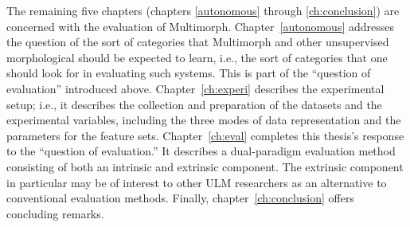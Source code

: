 The remaining five chapters (chapters \ref{autonomous} through \ref{ch:conclusion}) are concerned with the evaluation of Multimorph. Chapter~\ref{autonomous} addresses the question of the sort of categories that Multimorph and other unsupervised morphological should be expected to learn, i.e., the sort of categories that one should look for in evaluating such systems. This is part of the ``question of evaluation'' introduced above. Chapter~\ref{ch:experi} describes the experimental setup; i.e., it describes the collection and preparation of the datasets and the experimental variables, including the three modes of data representation and the parameters for the feature sets. Chapter~\ref{ch:eval} completes this thesis's response to the ``question of evaluation.'' It describes a dual-paradigm evaluation method consisting of both an intrinsic and extrinsic component. The extrinsic component in particular may be of interest to other \ac{ULM} researchers as an alternative to conventional evaluation methods. Finally, chapter~\ref{ch:conclusion} offers concluding remarks. 